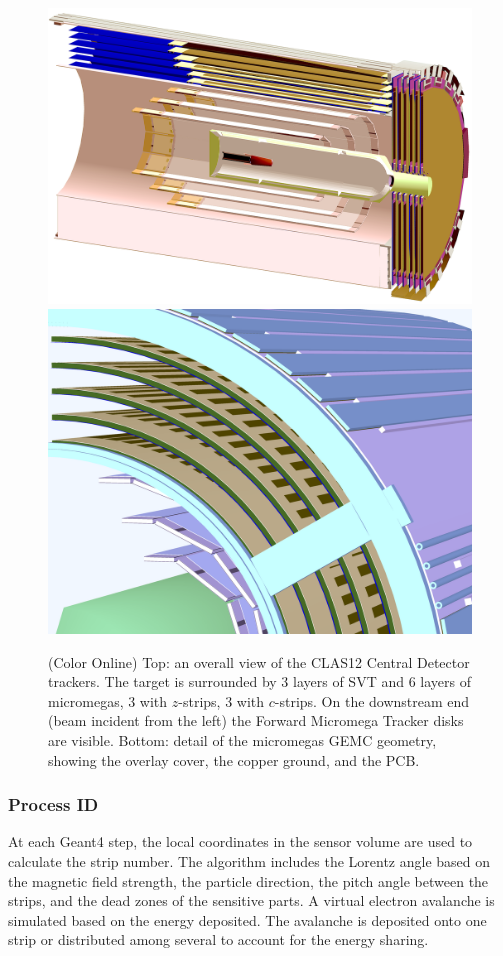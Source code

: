 \begin{figure}
	\centering
	\includegraphics[width=0.99\columnwidth,keepaspectratio]{img/bmtGeometry.png}
	\includegraphics[width=0.99\columnwidth,keepaspectratio]{img/bmtDetail.png}
	\caption{(Color Online) Top: an overall view of the CLAS12 Central Detector trackers. The target is surrounded by 3 layers of SVT and
            6 layers of micromegas, 3 with $z$-strips, 3 with $c$-strips. On the downstream end (beam incident from the left)
			the Forward Micromega Tracker disks are visible.
            Bottom: detail of the micromegas GEMC geometry, showing the overlay cover, the copper ground, and the PCB.}
	\label{fig:bmtGeometry}
\end{figure}


\subsubsection{Process ID}
At each Geant4 step, the local coordinates in the sensor volume are used to calculate the strip number.
The algorithm includes the Lorentz angle based on the magnetic field strength, the particle direction,
the pitch angle between the strips, and the dead zones of the sensitive parts.
A virtual electron avalanche is simulated based on the energy deposited. The avalanche
is deposited onto one strip or distributed among several to account for the energy sharing.



